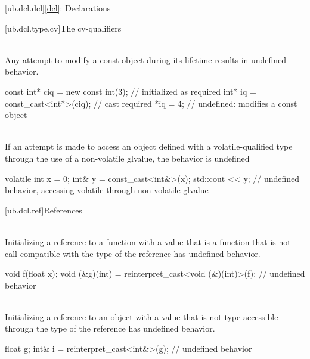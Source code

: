 [ub.dcl.dcl]{\ref{dcl}: Declarations}

[ub.dcl.type.cv]{The cv-qualifiers}

\pnum
{} \\
Any attempt to modify a const object during its lifetime results in
undefined behavior.

\pnum
\begin{example}
\begin{codeblock}
const int* ciq = new const int(3);  // initialized as required
int* iq = const_cast<int*>(ciq);    // cast required
*iq = 4;                            // undefined: modifies a const object
\end{codeblock}
\end{example}


\pnum
{} \\
If an attempt is made to
access an object defined with a volatile-qualified type through the use of a non-volatile glvalue, the behavior
is undefined

\pnum
\begin{example}
\begin{codeblock}
volatile int x = 0;
int& y = const_cast<int&>(x);
std::cout << y;         // undefined behavior, accessing volatile through non-volatile glvalue
\end{codeblock}
\end{example}

[ub.dcl.ref]{References}

\pnum
{} \\
Initializing a reference to a function
with a value that is a function
that is not call-compatible
with the type of the reference
has undefined behavior.

\pnum
\begin{example}
\begin{codeblock}
void f(float x);
void (&g)(int) = reinterpret_cast<void (&)(int)>(f);  // undefined behavior
\end{codeblock}
\end{example}

\pnum
{} \\
Initializing a reference to an object
with a value that is not
type-accessible through
the type of the reference
has undefined behavior.

\pnum
\begin{example}
\begin{codeblock}
float g;
int& i = reinterpret_cast<int&>(g);  // undefined behavior
\end{codeblock}
\end{example}


